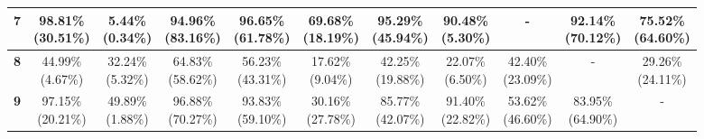 \documentclass{report}
\begin{document}
\begin{center}
{\begin{tabular}{|c|c|c|c|c|c|c|c|c|c|c|}
    \textbf{7} & \makecell{98.81\% \\ (30.51\%)} & \makecell{5.44\% \\ (0.34\%)} & \makecell{94.96\% \\ (83.16\%)} & \makecell{96.65\% \\ (61.78\%)} & \makecell{69.68\% \\ (18.19\%)} & \makecell{95.29\% \\ (45.94\%)} & \makecell{90.48\% \\ (5.30\%)} & - & \makecell{92.14\% \\ (70.12\%)} & \makecell{75.52\% \\ (64.60\%)} \\ \hline
    \textbf{8} & \makecell{44.99\% \\ (4.67\%)} & \makecell{32.24\% \\ (5.32\%)} & \makecell{64.83\% \\ (58.62\%)} & \makecell{56.23\% \\ (43.31\%)} & \makecell{17.62\% \\ (9.04\%)} & \makecell{42.25\% \\ (19.88\%)} & \makecell{22.07\% \\ (6.50\%)} & \makecell{42.40\% \\ (23.09\%)} & - & \makecell{29.26\% \\ (24.11\%)} \\ \hline
    \textbf{9} & \makecell{97.15\% \\ (20.21\%)} & \makecell{49.89\% \\ (1.88\%)} & \makecell{96.88\% \\ (70.27\%)} & \makecell{93.83\% \\ (59.10\%)} & \makecell{30.16\% \\ (27.78\%)} & \makecell{85.77\% \\ (42.07\%)} & \makecell{91.40\% \\ (22.82\%)} & \makecell{53.62\% \\ (46.60\%)} & \makecell{83.95\% \\ (64.90\%)} & - \\ \hline
    \end{tabular}
}
\end{center}
\end{document}
